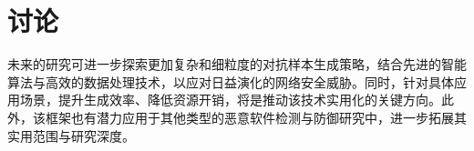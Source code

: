 \chapter{讨论}

未来的研究可进一步探索更加复杂和细粒度的对抗样本生成策略，结合先进的智能算法与高效的数据处理技术，以应对日益演化的网络安全威胁。同时，针对具体应用场景，提升生成效率、降低资源开销，将是推动该技术实用化的关键方向。此外，该框架也有潜力应用于其他类型的恶意软件检测与防御研究中，进一步拓展其实用范围与研究深度。

